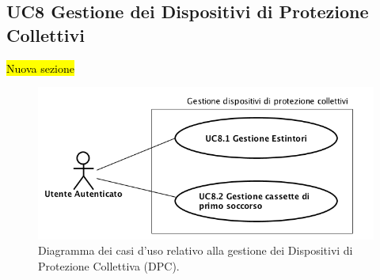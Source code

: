 	\newpage	
	\subsection{UC8 Gestione dei Dispositivi di Protezione Collettivi}
		\label{section:UC8}
		\hl{Nuova sezione}
		\begin{figure}[H]
			\begin{center}
				\includegraphics[width=12cm]{Pics/UC8GestioneDispositiviProtezioneCollettivi.png}
				\caption{Diagramma dei casi d'uso relativo alla gestione dei Dispositivi di Protezione Collettiva (DPC).}
				\label{fig:UC8_DPC}
			\end{center}
		\end{figure}
		
